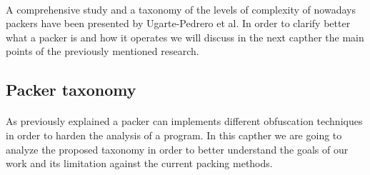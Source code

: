 \paragraph{}
A comprehensive study and a taxonomy of the levels of complexity of nowadays packers have been presented by Ugarte-Pedrero et al\cite{sokpacker}. 
In order to clarify better what a packer is and how it operates we will discuss in the next capther the main points of the previously mentioned research.

\subsection{Packer taxonomy}
\paragraph{}
As previously explained a packer can implements different obfuscation techniques in order to harden the analysis of a program. In this capther we are going to analyze the proposed taxonomy in order to better understand the goals of our work and its limitation against the current packing methods.

